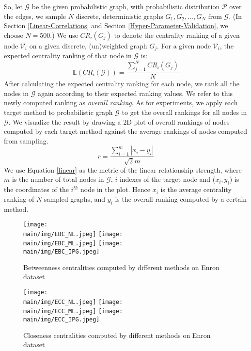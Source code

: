 \documentclass[\main/thesis.tex]{subfiles}
\begin{document}
So, let $\mathcal{G}$ be the given probabilistic graph, with probabilistic distribution $\mathcal{P}$ over the edges, we sample $N$ discrete, deterministic graphs $G_1, G_2, ..., G_N$ from $\mathcal{G}$. (In Section \ref{Linear-Correlations} and Section \ref{Hyper-Parameter-Validation}, we choose $N=500$.) We use $CR_{i}(G_{j})$ to denote the centrality ranking of a given node $\mathcal{V}_i$ on a given discrete, (un)weighted graph $G_{j}$. For a given node $\mathcal{V}_i$, the expected centrality ranking of that node in $\mathcal{G}$ is:
\begin{equation}
\mathbb{E}(CR_{i}(\mathcal{G})) = \frac{\sum_{j=1}^{N}CR_{i}(G_j)}{N}
\end{equation}
After calculating the expected centrality ranking for each node, we rank all the nodes in $\mathcal{G}$ again according to their expected ranking values. We refer to this newly computed ranking as \textit{overall ranking}. As for experiments, we apply each target method to probabilistic graph $\mathcal{G}$ to get the overall rankings for all nodes in $\mathcal{G}$. We visualize the result by drawing a 2D plot of overall rankings of nodes computed by each target method against the average rankings of nodes computed from sampling. 
\begin{equation}
r = \frac{\sum_{i=1}^{m} |x_i - y_i|}{\sqrt{2}m} \label{linear}
\end{equation}
We use Equation \ref{linear} as the metric of the linear relationship strength, where $m$ is the number of total nodes in $\mathcal{G}$, $i$ indexes of the target node and ($x_i, y_i$) is the coordinates of the $i^{th}$ node in the plot. Hence $x_i$ is  the average centrality ranking of $N$ sampled graphs, and $y_i$ is the overall ranking computed by a certain method.

\begin{figure}
\texttt{[image: \\main/img/EBC\_NL.jpeg]}
\texttt{[image: \\main/img/EBC\_ML.jpeg]}
\centering
\texttt{[image: \\main/img/EBC\_IPG.jpeg]}

\caption{Betweenness centralities computed by different methods on Enron dataset}
\label{btw_enron}
\end{figure}

\begin{figure}
\texttt{[image: \\main/img/ECC\_NL.jpeg]}
\texttt{[image: \\main/img/ECC\_ML.jpeg]}
\centering
\texttt{[image: \\main/img/ECC\_IPG.jpeg]}
\caption{Closeness centralities computed by different methods on Enron dataset}
\label{cl_enron}
\end{figure}
\end{document}
